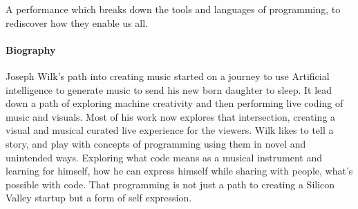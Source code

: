 \documentclass[sigplan,10pt,review]{acmart}\settopmatter{printfolios=true}
\begin{document}
A performance which breaks down the tools and languages of
programming, to rediscover how they enable us all.

\paragraph{Biography}
Joseph Wilk's path into creating music started on a journey to use Artificial
intelligence to generate music to send his new born daughter to
sleep. It lead down a path of exploring machine creativity and then
performing live coding of music and visuals. Most of his work now
explores that intersection, creating a visual and musical curated live
experience for the viewers. Wilk likes to tell a story, and play with
concepts of programming using them in novel and unintended
ways. Exploring what code means as a musical instrument and learning
for himself, how he can express himself while sharing with people, what's
possible with code. That programming is not just a path to creating a
Silicon Valley startup but a form of self expression.


\end{document}
